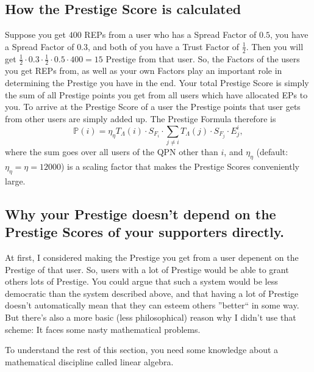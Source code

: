 \documentclass[a4paper,12pt]{scrartcl}
\begin{document}
\subsection{How the Prestige Score is calculated}
Suppose you get $400$ REPs from a user who has a Spread Factor of $0.5$, you have a Spread Factor of $0.3$, and both of you have a Trust Factor of $\frac{1}{2}$. Then you will get $\frac{1}{2}\cdot0.3 \cdot \frac{1}{2} \cdot 0.5 \cdot 400=15$ Prestige from that user. So, the Factors of the users you get REPs from, as well as your own Factors play an important role in determining the Prestige you have in the end. Your total Prestige Score is simply the sum of all Prestige points you get from all users which have allocated EPs to you. To arrive at the Prestige Score of a user the Prestige points that user gets from other users are simply added up. The Prestige Formula therefore is
$$\mathbb{P}(i) = \eta_{\eta} T_{\Lambda}(i) \cdot S_{F_i} \cdot \sum_{j \neq i} T_{\Lambda}(j) \cdot S_{F_j} \cdot E^i_j,$$
where the sum goes over all users of the QPN other than $i$, and $\eta_{\eta}$ (default: $\eta_{\eta} = \eta = 12000$) is a scaling factor that makes the Prestige Scores conveniently large.


\subsection{Why your Prestige doesn’t depend on the Prestige Scores of your supporters directly.}
At first, I considered making the Prestige you get from a user depenent on the Prestige of that user. So, users with a lot of Prestige would be able to grant others lots of Prestige. You could argue that such a system would be less democratic than the system described above, and that having a lot of Prestige doesn't automatically mean that they can esteem others ''better`` in some way. But there's also a more basic (less philosophical) reason why I didn't use that scheme: It faces some nasty mathematical problems.

To understand the rest of this section, you need some knowledge about a mathematical discipline called linear algebra.
\end{document}
